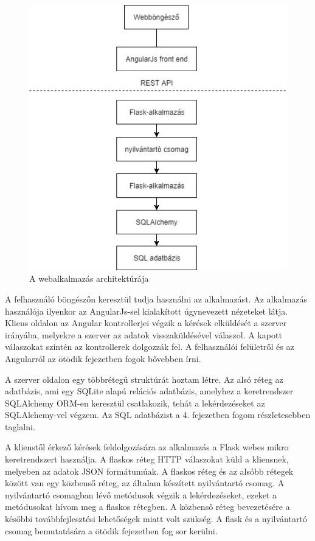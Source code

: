 \begin{figure}
\centering
\includegraphics[scale=0.8]{kepek/architecture.jpg}
\caption{A webalkalmazás architektúrája}
\label{fig:architecture}
\end{figure}

A felhasználó böngészőn keresztül tudja használni az alkalmazást. Az alkalmazás használója ilyenkor az AngularJs-sel kialakított úgynevezett nézeteket látja. Kliens oldalon az Angular kontrollerjei végzik a kérések elküldését a szerver irányába, melyekre a szerver az adatok visszaküldésével válaszol. A kapott válaszokat szintén az kontrollerek dolgozzák fel. A felhasználói felületről és az Angularról az ötödik fejezetben fogok bővebben írni.


A szerver oldalon egy többrétegű struktúrát hoztam létre. Az alsó réteg az adatbázis, ami egy SQLite alapú relációs adatbázis, amelyhez a keretrendszer SQLAlchemy ORM-en keresztül csatlakozik, tehát a lekérdezéseket az SQLAlchemy-vel végzem. Az SQL adatbázist a 4. fejezetben fogom részletesebben taglalni.

A klienstől érkező kérések feldolgozására az alkalmazás a Flask webes mikro keretrendszert használja. A flaskos réteg HTTP válaszokat küld a kliensnek, melyeben az adatok JSON formátumúak. A flaskos réteg és az alsóbb rétegek között van egy közbenső réteg, az általam készített nyilvántartó csomag. A nyilvántartó csomagban lévő metódusok végzik a lekérdezéseket, ezeket a metódusokat hívom meg a flaskos rétegben. A közbenső réteg bevezetésére a későbbi továbbfejlesztési lehetőségek miatt volt szükség. A flask és a nyilvántartó csomag bemutatására a ötödik fejezetben fog sor kerülni.

